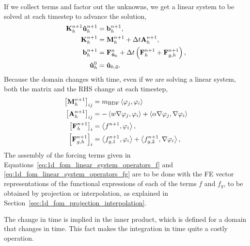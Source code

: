 \documentclass[../main.tex]{subfiles}
\newcommand{\inner}[2]{\left<#1, #2\right>}
\begin{document}
If we collect terms and factor out the unknowns, we get a linear system to be solved at each timestep to advance the solution,
\begin{subequations}
    \begin{align}
        \label{eq:1d_fom_linear_system_timestep}
        \vb{K}_h^{n+1} \vb{\hat{u}}_h^{n+1} &= \vb{b}_h^{n+1}, \\
        \vb{K}_h^{n+1} &= \vb{M}_{h}^{n+1} + \Delta t \vb{A}_{h}^{n+1}, \\
        \vb{b}_h^{n+1} &= \vb{F}_{\vb{\hat{u}}_h}^{n} + \Delta t \left(\vb{F}_h^{n+1} + \vb{F}_{g,h}^{n+1}\right), \\
        \vb{\hat{u}}_h^{0} &= \vb{\hat{u}}_{h,0}.
    \end{align}
\end{subequations}
Because the domain changes with time, even if we are solving a linear system, both the matrix and the RHS change at each timestep,
\begin{subequations}
    \label{eq:1d_fom_linear_system_operators}
    \begin{align}
        \left[\vb{M}_{h}^{n+1}\right]_{ij} &= m_{\text{BDF}} \inner{\varphi_j}{\varphi_i}  \\
        \left[\vb{A}_{h}^{n+1}\right]_{ij} &= -\inner{w \grad \varphi_j}{\varphi_i} + \inner{\alpha \grad \varphi_j}{\grad \varphi_i} \\
        \left[\vb{F}_{h}^{n+1}\right]_{i} &= \inner{f^{n+1}}{\varphi_i}, \label{eq:1d_fom_linear_system_operators_f} \\
        \left[\vb{F}_{{g,h}}^{n+1}\right]_{i} &= \inner{f_{g,1}^{n+1}}{\varphi_i} + \inner{f_{g,2}^{n+1}}{\grad \varphi_i}, \label{eq:1d_fom_linear_system_operators_fg}
    \end{align}
\end{subequations}
The assembly of the forcing terms given in Equations~\eqref{eq:1d_fom_linear_system_operators_f} and \eqref{eq:1d_fom_linear_system_operators_fg}
are to be done with the FE vector representations of the functional expressions of each of the terms $f$ and $f_g$, to be obtained by projection or interpolation, as explained in Section~\ref{sec:1d_fom_projection_interpolation}.

The change in time is implied in the inner product, which is defined for a domain that changes in time. 
This fact makes the integration in time quite a costly operation.
\end{document}
